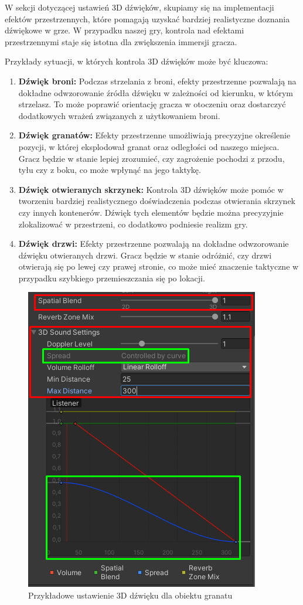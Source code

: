 W sekcji dotyczącej ustawień 3D dźwięków, skupiamy się na implementacji efektów przestrzennych, które pomagają uzyskać bardziej realistyczne doznania dźwiękowe w grze. W przypadku naszej gry, kontrola nad efektami przestrzennymi staje się istotna dla zwiększenia immersji gracza.

Przykłady sytuacji, w których kontrola 3D dźwięków może być kluczowa:

\begin{enumerate}
    \item \textbf{Dźwięk broni:} Podczas strzelania z broni, efekty przestrzenne pozwalają na dokładne odwzorowanie źródła dźwięku w zależności od kierunku, w którym strzelasz. To może poprawić orientację gracza w otoczeniu oraz dostarczyć dodatkowych wrażeń związanych z użytkowaniem broni.
    \item \textbf{Dźwięk granatów:} Efekty przestrzenne umożliwiają precyzyjne określenie pozycji, w której eksplodował granat oraz odległości od naszego miejsca. Gracz będzie w stanie lepiej zrozumieć, czy zagrożenie pochodzi z przodu, tyłu czy z boku, co może wpłynąć na jego taktykę.
    \item \textbf{Dźwięk otwieranych skrzynek:} Kontrola 3D dźwięków może pomóc w tworzeniu bardziej realistycznego doświadczenia podczas otwierania skrzynek czy innych kontenerów. Dźwięk tych elementów będzie można precyzyjnie zlokalizować w przestrzeni, co dodatkowo podniesie realizm gry.
    \item \textbf{Dźwięk drzwi:} Efekty przestrzenne pozwalają na dokładne odwzorowanie dźwięku otwieranych drzwi. Gracz będzie w stanie odróżnić, czy drzwi otwierają się po lewej czy prawej stronie, co może mieć znaczenie taktyczne w przypadku szybkiego przemieszczania się po lokacji.
\end{enumerate}

\begin{figure}[h]
    \centering
    \includegraphics[scale=0.5]{Images/grenade3DSet.png}
    \caption{Przykładowe ustawienie 3D dźwięku dla obiektu granatu}
\end{figure}